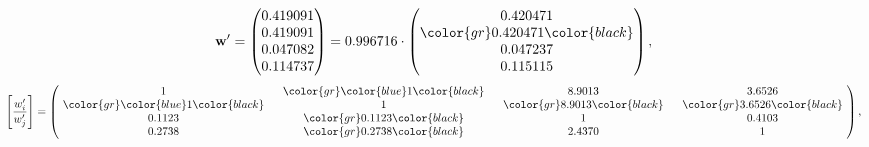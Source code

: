 \begin{example}
\begin{equation*}
\mathbf{w}^{\prime} =
\begin{pmatrix}
0.419091\\
0.419091\\
0.047082\\
0.114737
\end{pmatrix} =
0.996716\cdot
\begin{pmatrix}
0.420471\\
\color{gr} 0.420471\color{black} \\
0.047237\\
0.115115
\end{pmatrix},
\end{equation*}
\begin{equation*}
\left[ \frac{{w}^{\prime}_i}{{w}^{\prime}_j} \right] =
\begin{pmatrix}
$\,\,$ 1 $\,\,$ & $\,\,$\color{gr} \color{blue} 1\color{black} $\,\,$ & $\,\,$8.9013$\,\,$ & $\,\,$3.6526$\,\,$ \\
$\,\,$\color{gr} \color{blue} 1\color{black} $\,\,$ & $\,\,$ 1 $\,\,$ & $\,\,$\color{gr} 8.9013\color{black} $\,\,$ & $\,\,$\color{gr} 3.6526\color{black}   $\,\,$ \\
$\,\,$0.1123$\,\,$ & $\,\,$\color{gr} 0.1123\color{black} $\,\,$ & $\,\,$ 1 $\,\,$ & $\,\,$0.4103 $\,\,$ \\
$\,\,$0.2738$\,\,$ & $\,\,$\color{gr} 0.2738\color{black} $\,\,$ & $\,\,$2.4370$\,\,$ & $\,\,$ 1  $\,\,$ \\
\end{pmatrix},
\end{equation*}
\end{example}
\newpage
